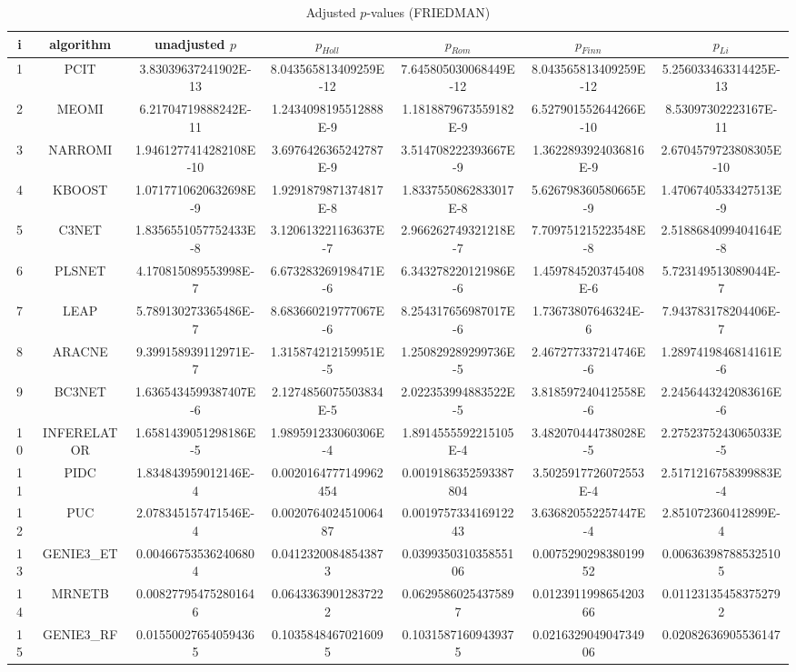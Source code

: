 \documentclass[a4paper,10pt]{article}
\begin{document}
\begin{landscape}
\begin{table}[!htp]
\centering\scriptsize
\caption{Adjusted $p$-values (FRIEDMAN)}
\begin{tabular}{ccccccc}
i&algorithm&unadjusted $p$&$p_{Holl}$&$p_{Rom}$&$p_{Finn}$&$p_{Li}$\\
\hline
1&PCIT&3.83039637241902E-13&8.043565813409259E-12&7.645805030068449E-12&8.043565813409259E-12&5.256033463314425E-13\\
2&MEOMI&6.21704719888242E-11&1.2434098195512888E-9&1.1818879673559182E-9&6.527901552644266E-10&8.53097302223167E-11\\
3&NARROMI&1.9461277414282108E-10&3.6976426365242787E-9&3.514708222393667E-9&1.3622893924036816E-9&2.6704579723808305E-10\\
4&KBOOST&1.0717710620632698E-9&1.9291879871374817E-8&1.8337550862833017E-8&5.626798360580665E-9&1.4706740533427513E-9\\
5&C3NET&1.8356551057752433E-8&3.120613221163637E-7&2.966262749321218E-7&7.709751215223548E-8&2.5188684099404164E-8\\
6&PLSNET&4.170815089553998E-7&6.673283269198471E-6&6.343278220121986E-6&1.4597845203745408E-6&5.723149513089044E-7\\
7&LEAP&5.789130273365486E-7&8.683660219777067E-6&8.254317656987017E-6&1.73673807646324E-6&7.943783178204406E-7\\
8&ARACNE&9.399158939112971E-7&1.315874212159951E-5&1.250829289299736E-5&2.467277337214746E-6&1.2897419846814161E-6\\
9&BC3NET&1.6365434599387407E-6&2.1274856075503834E-5&2.022353994883522E-5&3.818597240412558E-6&2.2456443242083616E-6\\
10&INFERELATOR&1.6581439051298186E-5&1.989591233060306E-4&1.8914555592215105E-4&3.482070444738028E-5&2.2752375243065033E-5\\
11&PIDC&1.834843959012146E-4&0.0020164777149962454&0.0019186352593387804&3.5025917726072553E-4&2.5171216758399883E-4\\
12&PUC&2.078345157471546E-4&0.002076402451006487&0.001975733416912243&3.636820552257447E-4&2.851072360412899E-4\\
13&GENIE3_ET&0.004667535362406804&0.04123200848543873&0.039935031035855106&0.007529029838019952&0.006363987885325105\\
14&MRNETB&0.008277954752801646&0.06433639012837222&0.06295860254375897&0.012391199865420366&0.011231354583752792\\
15&GENIE3_RF&0.015500276540594365&0.10358484670216095&0.10315871609439375&0.021632904904734906&0.02082636905536147\\

\end{tabular}
\end{table}
\end{landscape}
\end{document}
